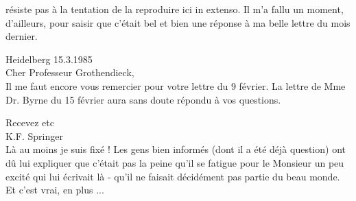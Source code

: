 résiste pas à la tentation de la reproduire ici  in extenso.\deleted{\handwritten{\unsure{-}}} Il m'a fallu un moment, d'ailleurs, pour saisir que c'était bel et bien une réponse à ma belle lettre  du mois dernier\deleted{\unsure{,}}. 

Heidelberg 15.3.1985\\
Cher Professeur Grothendieck,\\

Il me faut encore vous remercier pour votre lettre du 9 février. La lettre de Mme Dr. Byrne du 15 février aura sans doute répondu à vos questions.

Recevez etc\\
K.F. Springer \\

Là au moins je suis fixé ! Les gens bien informés (dont il a été déjà question) ont dû lui expliquer que c'était pas la peine qu'il se fatigue pour le Monsieur un peu excité qui lui écrivait là - qu'il ne faisait décidément pas partie du beau monde. Et c'est vrai, en plus ...

